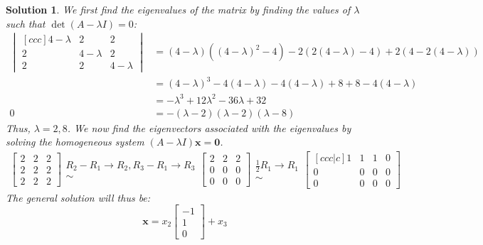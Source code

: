\documentclass[11pt]{scrartcl}
\theoremstyle{dotlessP}
\newtheorem{sol}{Solution}[section]
\theoremstyle{dotlessN}
\begin{document}
\begin{sol}
	We first find the eigenvalues of the matrix by finding the values of $\lambda$ such that $\det(A-\lambda I) = 0$:
	 \begin{align*}
		 \begin{vmatrix}[ccc]
			 4 - \lambda & 2 & 2 \\
			 2 & 4 - \lambda & 2 \\
			 2 & 2 & 4 - \lambda
		 \end{vmatrix} &= 
		(4-\lambda)((4-\lambda)^2 - 4) - 2(2(4-\lambda) - 4) + 2(4 - 2(4-\lambda)) \\
		&= (4-\lambda)^3 - 4(4 - \lambda) - 4(4 - \lambda) + 8 + 8 - 4(4-\lambda) \\
		&= -\lambda^3 + 12\lambda^2 - 36\lambda + 32 \\
	0	&= -(\lambda - 2)(\lambda - 2)(\lambda - 8)
	\end{align*}
	Thus, $\lambda = 2, 8$. We now find the eigenvectors associated with the eigenvalues by solving the homogeneous system $(A- \lambda I)\bm{x} = \bm{0}$.
	\begin{align*}
		\begin{bmatrix}
			2 & 2 & 2 \\
			2 & 2 & 2 \\
			2 & 2 & 2
		\end{bmatrix} 
		\begin{array}{c}
			R_2 - R_1 \to R_2, R_3 - R_1 \to R_3 \\
			\sim
		\end{array}
		\begin{bmatrix}
			2 & 2 & 2 \\
			0 & 0 & 0\\
			0 & 0 &0 
		\end{bmatrix}
		\begin{array}{c}
			\frac{1}{2}R_1 \to R_1 \\
			\sim
		\end{array}
		\begin{bmatrix}[ccc|c]
			1 & 1 & 1 & 0\\
			0 & 0 & 0 & 0\\
			0 & 0 & 0 & 0
		\end{bmatrix}
	\end{align*}
	The general solution will thus be:
	\[
		\bm{x} = x_2
		\begin{bmatrix}
			-1 \\
			1 \\
			0
		\end{bmatrix} + x_3
\]
\end{sol}
\end{document}
